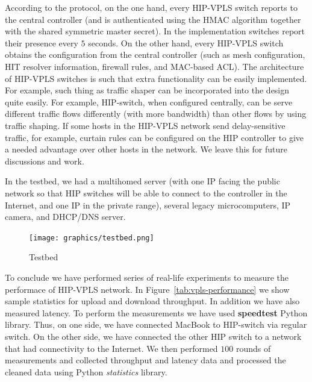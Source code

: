 According to the protocol, on the one hand, every HIP-VPLS 
switch reports to the central controller (and is authenticated 
using the HMAC algorithm together with the shared symmetric 
master secret). In the implementation switches report their presence every $5$ 
seconds. On the other hand, every HIP-VPLS switch obtains 
the configuration from the central controller (such as mesh 
configuration, HIT resolver information, firewall rules, and 
MAC-based ACL). The architecture of HIP-VPLS switches is such
that extra functionality can be easily implemented. For example,
such thing as traffic shaper can be incorporated into the design
quite easily. For example, HIP-switch, when configured centrally, 
can be serve different traffic flows differently (with more bandwidth) than other 
flows by using traffic shaping. If some hosts in the HIP-VPLS network send delay-sensitive traffic, 
for example, curtain rules can be configured on the HIP controller 
to give a needed advantage over other hosts in the network. We 
leave this for future discussions and work.

In the testbed, we had a multihomed server (with one IP facing 
the public network so that HIP switches will be able to connect to 
the controller in the Internet, and one IP in the private range), 
several legacy microcomputers, IP camera, and DHCP/DNS server.

\begin{figure}[!ht]
    \centering
    \texttt{[image: graphics/testbed.png]}
    \caption{Testbed}
    \label{fig:testbed}
\end{figure}

To conclude we have performed series of real-life experiments to measure the 
performace of HIP-VPLS network. In Figure~\ref{tab:vpls-performance} we show
sample statistics for upload and download throughput. In addition we have also
measured latency. To perform the measurements we have used {\bf speedtest}
Python library. Thus, on one side, we have connected MacBook to HIP-switch via regular
switch. On the other side, we have connected the other HIP switch to a network 
that had connectivity to the Internet. We then performed $100$ rounds of measurements
and collected throughput and latency data and processed the cleaned data using Python
{\it statistics} library.

